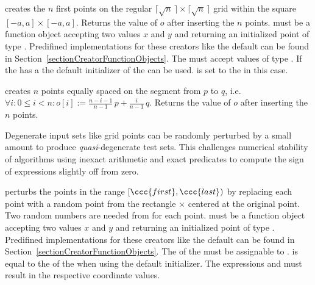 \def\ccLongParamLayout{\ccTrue}
{ creates the $n$ first points on the regular $\lceil\sqrt{n}\,\rceil
    \times \lceil  \sqrt{n}\,\rceil$ grid within the square
    $[-a,a]\times [-a,a]$. Returns the value of $o$ after inserting
    the $n$ points. 
    \ccPrecond {} must be a function object accepting two
     values $x$ and $y$ and returning an initialized point
     of type . Predifined implementations for these
    creators like the default can be found in
    Section~\ref{sectionCreatorFunctionObjects}. The
     must accept values of type . If the
     has a  the default
    initializer of the  can be used.  is set to
    the  in this case.}
\def\ccLongParamLayout{\ccFalse}


{ creates $n$ points equally spaced on the segment from $p$ to $q$,
    i.e.~$\forall i: 0 \le i < n: o[i] := \frac{n-i-1}{n-1}\, p +
    \frac{i}{n-1}\, q$. Returns the value of $o$ after inserting
    the $n$ points.}


Degenerate input sets like grid points can be randomly perturbed by a
small amount to produce {\em quasi}-degenerate test sets. This
challenges numerical stability of algorithms using inexact arithmetic and
exact predicates to compute the sign of expressions slightly off from zero.

{ perturbs the points in the range $[\ccc{first},\ccc{last})$ by
  replacing each point with a random point from the rectangle
   $\times$  centered at the original point.
  Two random numbers are needed from  for each point.
  \ccPrecond   {} must be a function object accepting two
     values $x$ and $y$ and returning an initialized point
     of type . Predifined implementations for these
    creators like the default can be found in
    Section~\ref{sectionCreatorFunctionObjects}. The  of the
     must be assignable to .
     is equal to the  of the
     when using the default initializer.
    The expressions  and
     must result in the respective
    coordinate values.
}

